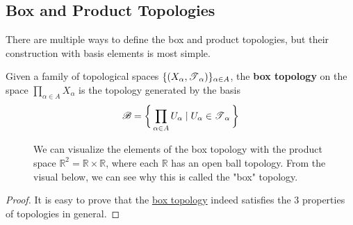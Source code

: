 \subsection{Box and Product Topologies} 

  There are multiple ways to define the box and product topologies, but their construction with basis elements is most simple. 

  \begin{definition}
    \label{def:box-topology}
    Given a family of topological spaces $\{(X_\alpha, \operatorname{\mathscr{T}}_\alpha)\}_{\alpha \in A}$, the \textbf{box topology} on the space $\prod_{\alpha \in A} X_\alpha$ is the topology generated by the basis 
    \begin{equation}
      \mathscr{B} = \bigg\{ \prod_{\alpha \in A} U_\alpha \mid U_\alpha \in \operatorname{\mathscr{T}}_\alpha \bigg\}
    \end{equation}

    \begin{figure}[H]
      \centering 
      \caption{We can visualize the elements of the box topology with the product space $\mathbb{R}^2 = \mathbb{R} \times \mathbb{R}$, where each $\mathbb{R}$ has an open ball topology. From the visual below, we can see why this is called the "box" topology. }
      \label{fig:box_topology}
    \end{figure}
  \end{definition}
  \begin{proof}
    It is easy to prove that the \hyperref[def:box-topology]{box topology} indeed satisfies the 3 properties of topologies in general. 
  \end{proof}
	
